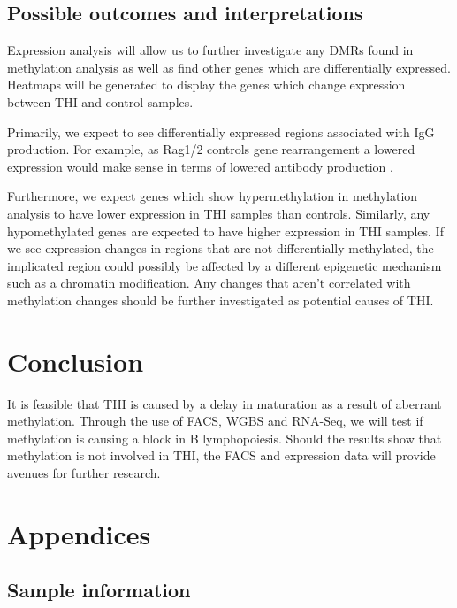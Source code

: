 \documentclass[12pt]{article}
\begin{document}
		\subsection{Possible outcomes and interpretations}				
			
			Expression analysis will allow us to  further investigate any DMRs found in methylation analysis as well as find other genes which are differentially expressed. 
			Heatmaps will be generated to display the genes which change expression between THI and control samples.
			
			Primarily, we expect to see differentially expressed regions associated with IgG production. 
			For example, as Rag1/2 controls gene rearrangement a lowered expression would make sense in terms of lowered antibody production \citep{Choukrallah14}.
			
			Furthermore, we expect genes which show hypermethylation in methylation analysis to have lower expression in THI samples than controls. 
			Similarly, any hypomethylated genes are expected to have higher expression in THI samples.
			If we see expression changes in regions that are not differentially methylated, the implicated region could possibly be affected by a different epigenetic mechanism such as a chromatin modification.
			Any changes that aren't correlated with methylation changes should be further investigated as potential causes of THI.
			

			
	\section{Conclusion}
	
		It is feasible that THI is caused by a delay in maturation as a result of aberrant methylation. 
		Through the use of FACS, WGBS and RNA-Seq, we will test if methylation is causing a block in B lymphopoiesis. 
		Should the results show that methylation is not involved in THI, the FACS and expression data will provide avenues for further research.
		
	\appendix
	\section{Appendices}
	
	\subsection{Sample information}
\end{document}
